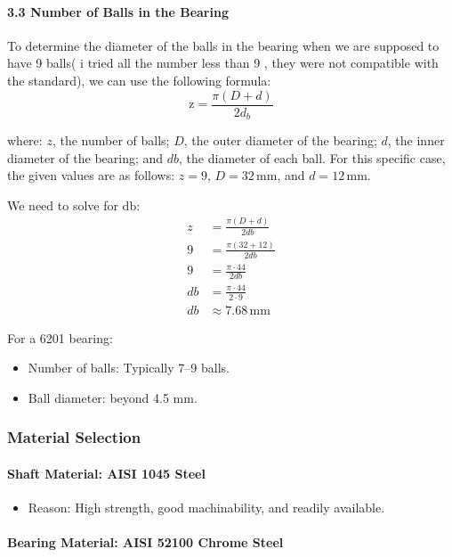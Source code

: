 \documentclass[../../main]{subfiles}
\begin{document}
\paragraph{3.3 Number of Balls in the Bearing}

To determine the diameter of the balls in the bearing when we are
supposed to have 9 balls( i tried all the number less than 9 , they were
not compatible with the standard), we can use the following formula:
\begin{equation}
  \text{z} = \frac{\pi (D + d)}{2 d_b}
  \label{eq4}
\end{equation}

where: $z$, the number of balls; $D$, the outer diameter of the bearing; $d$, the inner diameter of the bearing; and $db$, the diameter of each ball. For this specific case, the given values are as follows: $z = 9$, $D = 32 \, \mathrm{mm}$, and $d = 12 \, \mathrm{mm}$.

We need to solve for db:
\begin{align*}
  z &= \frac{\pi (D + d)}{2 db} \\
  9 &= \frac{\pi (32 + 12)}{2 db} \\
  9 &= \frac{\pi \cdot 44}{2 db} \\
  db &= \frac{\pi \cdot 44}{2 \cdot 9} \\
  db &\approx 7.68 \, \mathrm{mm}
\end{align*}

For a 6201 bearing:

\begin{itemize}
\item
  Number of balls: Typically 7--9 balls.
\item
  Ball diameter: beyond 4.5 mm.
\end{itemize}

\subsubsection{Material Selection}
\paragraph{Shaft Material: AISI 1045 Steel}

\begin{itemize}
\item
  Reason: High strength, good machinability, and readily available.
\end{itemize}

\paragraph{Bearing Material: AISI 52100 Chrome Steel}
\end{document}
